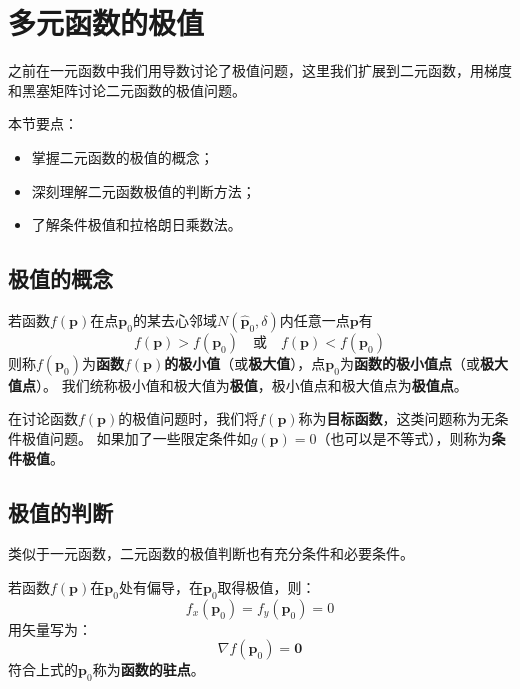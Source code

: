 \section{多元函数的极值}

之前在一元函数中我们用导数讨论了极值问题，这里我们扩展到二元函数，用梯度和黑塞矩阵讨论二元函数的极值问题。

本节要点：
\begin{itemize}
    \item 掌握二元函数的极值的概念；
    \item 深刻理解二元函数极值的判断方法；
    \item 了解条件极值和拉格朗日乘数法。
\end{itemize}

\subsection{极值的概念}

\begin{definition}[极值]
若函数$f\left( \boldsymbol{p} \right) $在点$\boldsymbol{p}_0$的某去心邻域$N\left( \boldsymbol{\hat{p}}_0,\delta \right) $内任意一点$\boldsymbol{p}$有
\[
f\left( \boldsymbol{p} \right) >f\left( \boldsymbol{p}_0 \right) \quad \text{或} \quad f\left( \boldsymbol{p} \right) <f\left( \boldsymbol{p}_0 \right)
\]
则称$f\left( \boldsymbol{p}_0 \right) $为{\bf 函数$f\left( \boldsymbol{p} \right) $的极小值}（或{\bf 极大值}），点$\boldsymbol{p}_0$为{\bf 函数的极小值点}（或{\bf 极大值点}）。
我们统称极小值和极大值为{\bf 极值}，极小值点和极大值点为{\bf 极值点}。
\end{definition}

在讨论函数$f\left( \boldsymbol{p} \right) $的极值问题时，我们将$f\left( \boldsymbol{p} \right) $称为{\bf 目标函数}，这类问题称为无条件极值问题。
如果加了一些限定条件如$g\left( \boldsymbol{p} \right) =0$（也可以是不等式），则称为{\bf 条件极值}。

\subsection{极值的判断}

类似于一元函数，二元函数的极值判断也有充分条件和必要条件。

\begin{theorem}[极值的充分条件]
若函数$f\left( \boldsymbol{p} \right) $在$\boldsymbol{p}_0$处有偏导，在$\boldsymbol{p}_0$取得极值，则：
\[
f_x\left( \boldsymbol{p}_0 \right) =f_y\left( \boldsymbol{p}_0 \right) =0
\]
用矢量写为：
\[
\nabla f\left( \boldsymbol{p}_0 \right) =\mathbf{0}
\]
符合上式的$\boldsymbol{p}_0$称为{\bf 函数的驻点}。
\end{theorem}

